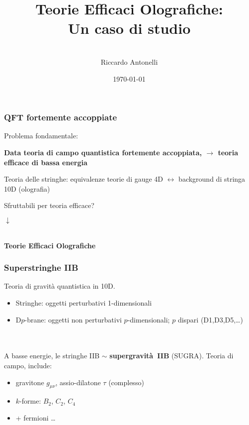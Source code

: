 \documentclass[aspectratio=43,mathserif]{beamer}
\title{Teorie Efficaci Olografiche:\\ Un caso di studio}
\author{\vspace{10pt}\\\large Riccardo Antonelli }
\date{\today}
\begin{document}
\begin{frame}
	\maketitle
\end{frame}

\begin{frame}
	\frametitle{QFT fortemente accoppiate}
	Problema fondamentale:
	\begin{center}\textbf{
		Data teoria di campo quantistica fortemente accoppiata, $\longrightarrow$ teoria efficace di bassa energia}
	\end{center}

	\vfill Teoria delle stringhe: equivalenze teorie di gauge 4D $\leftrightarrow$ background di stringa 10D (olografia)

	\vfill Sfruttabili per teoria efficace?

	\begin{center} $\downarrow$
	
		~\\
	
	\textbf{Teorie Efficaci Olografiche}
	\end{center}

	

\end{frame}

\begin{frame}
	\frametitle{Superstringhe IIB}
	Teoria di gravità quantistica in 10D.

	\begin{itemize}
		\item Stringhe: oggetti perturbativi 1-dimensionali
		\item D$p$-brane: oggetti non perturbativi $p$-dimensionali; $p$ dispari (D1,D3,D5,\ldots)
	\end{itemize}

	~\\~\\

	A basse energie, le stringhe IIB $\sim$ \textbf{supergravità~IIB} (SUGRA). Teoria di campo, include:

	\begin{itemize}
		\item gravitone $g_{\mu\nu}$, assio-dilatone $\tau$ (complesso)
		\item $k$-forme: $B_2$, $C_2$, $C_4$
		\item + fermioni \ldots
	\end{itemize}
\end{frame}
\end{document}
